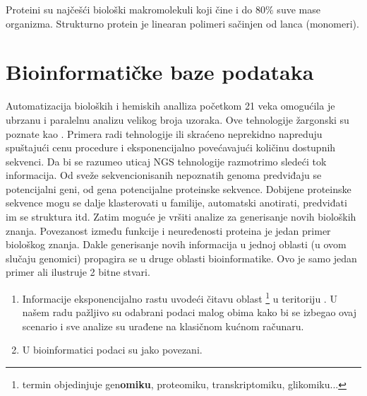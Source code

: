 Proteini su najčešći biološki makromolekuli koji čine i do $80\%$ suve mase
organizma.  Strukturno protein je linearan polimeri sačinjen od lanca
(monomeri). 



\section {Bioinformatičke baze podataka}

Automatizacija bioloških i hemiskih analliza početkom 21 veka omogućila je
ubrzanu i paralelnu analizu velikog broja uzoraka. Ove tehnologije žargonski su
poznate kao  . Primera radi tehnologije 
 ili skraćeno  neprekidno napreduju
spuštajući cenu procedure i eksponencijalno povećavajući količinu dostupnih
sekvenci. Da bi se razumeo uticaj NGS tehnologije razmotrimo sledeći tok
informacija.  Od sveže sekvencionisanih nepoznatih genoma predviđaju se
potencijalni geni, od gena potencijalne proteinske sekvence.  Dobijene
proteinske sekvence mogu se dalje klasterovati u familije, automatski
anotirati, predviđati im se struktura itd.  Zatim moguće je vršiti analize za
generisanje novih bioloških znanja. Povezanost između funkcije i neuređenosti
proteina je jedan primer biološkog znanja. Dakle generisanje novih informacija
u jednoj oblasti (u ovom slučaju genomici) propagira se u druge oblasti
bioinformatike. Ovo je samo jedan primer ali ilustruje 2 bitne stvari.
\begin{enumerate}
  \item Informacije eksponencijalno rastu uvodeći čitavu oblast
    \footnote{termin objedinjuje gen\textbf{omiku}, proteomiku,
    transkriptomiku, glikomiku...}   u teritoriju \parencite{Chen2017}. U našem radu pažljivo su odabrani podaci malog
  obima kako bi se izbegao ovaj scenario i sve analize su urađene na klasičnom
  kućnom računaru.
  \item U bioinformatici podaci su jako povezani. 
\end{enumerate}

